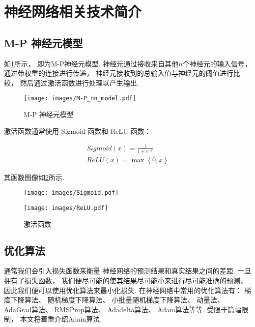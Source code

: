 \section{神经网络相关技术简介}

\subsection{M-P 神经元模型}

如\cref{fig:M-P}所示，
即为M-P神经元模型.
神经元通过接收来自其他$n$个神经元的输入信号，
通过带权重的连接进行传递，
神经元接收到的总输入值与神经元的阈值进行比较，
然后通过激活函数进行处理以产生输出\cite{zhouzhihuaJiQiXueXi}.

\begin{figure}[!htbp]
    \centering
    \texttt{[image: images/M-P\_nn\_model.pdf]}
    \caption{M-P 神经元模型}\label{fig:M-P}
\end{figure}

激活函数通常使用 Sigmoid 函数和 ReLU 函数：

\begin{equation}
    \label{eq:sigmoid}
    \begin{aligned}
        Sigmoid\left(x\right) = \frac{1}{1+e^{-x}} \\
        ReLU\left(x\right) = \max\left\{0, x\right\}
    \end{aligned}
\end{equation}

其函数图像如\cref{fig:active-func}所示.

\begin{figure}
    \centering
    \begin{minipage}[b]{0.45\textwidth}
        \centering
        \texttt{[image: images/Sigmoid.pdf]}
        \label{fig:sigmoid}
    \end{minipage}
    \begin{minipage}[b]{0.45\textwidth}
        \centering
        \texttt{[image: images/ReLU.pdf]}
        \label{fig:ReLu}
    \end{minipage}
    \caption{激活函数}\label{fig:active-func}
\end{figure}

\subsection{优化算法}

通常我们会引入损失函数来衡量
神经网络的预测结果和真实结果之间的差距.
一旦拥有了损失函数，
我们便尽可能的使其结果尽可能小来进行尽可能准确的预测，
因此我们便可以使用优化算法来最小化损失.
在神经网络中常用的优化算法有：
梯度下降算法、
随机梯度下降算法、
小批量随机梯度下降算法、
动量法、
AdaGrad算法、
RMSProp算法、
Adadelta算法、
Adam算法等等.
受限于篇幅限制，
本文将着重介绍Adam算法.

